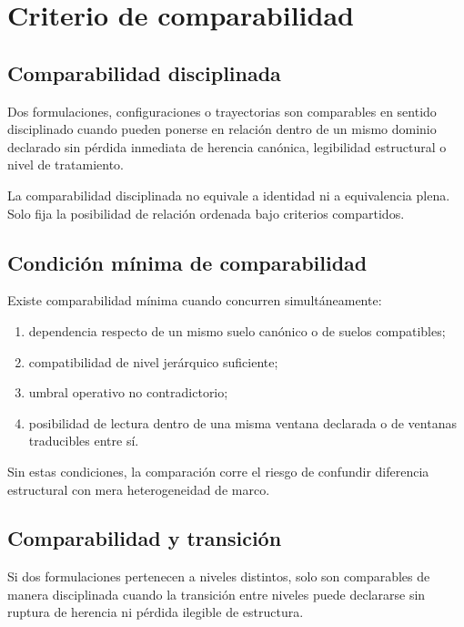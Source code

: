 \chapter{Criterio de comparabilidad}

\section{Comparabilidad disciplinada}
\begin{definition}
Dos formulaciones, configuraciones o trayectorias son comparables en sentido disciplinado cuando pueden ponerse en relación dentro de un mismo dominio declarado sin pérdida inmediata de herencia canónica, legibilidad estructural o nivel de tratamiento.
\end{definition}

\begin{observation}
La comparabilidad disciplinada no equivale a identidad ni a equivalencia plena. Solo fija la posibilidad de relación ordenada bajo criterios compartidos.
\end{observation}

\section{Condición mínima de comparabilidad}
\begin{definition}
Existe comparabilidad mínima cuando concurren simultáneamente:
\begin{enumerate}
  \item dependencia respecto de un mismo suelo canónico o de suelos compatibles;
  \item compatibilidad de nivel jerárquico suficiente;
  \item umbral operativo no contradictorio;
  \item posibilidad de lectura dentro de una misma ventana declarada o de ventanas traducibles entre sí.
\end{enumerate}
\end{definition}

\begin{observation}
Sin estas condiciones, la comparación corre el riesgo de confundir diferencia estructural con mera heterogeneidad de marco.
\end{observation}

\section{Comparabilidad y transición}
\begin{definition}
Si dos formulaciones pertenecen a niveles distintos, solo son comparables de manera disciplinada cuando la transición entre niveles puede declararse sin ruptura de herencia ni pérdida ilegible de estructura.
\end{definition}

